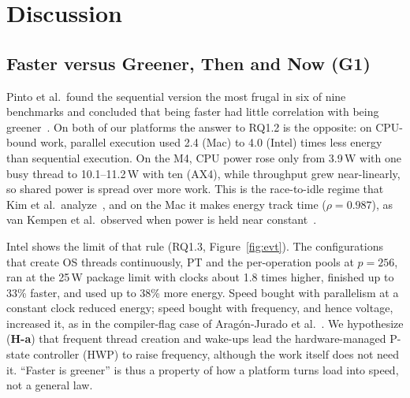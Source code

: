 \section{Discussion}\label{sec:discussion}

\subsection{Faster versus Greener, Then and Now (G1)}
Pinto et al.\ found the sequential version the most frugal in six of nine benchmarks and concluded that being faster had little correlation with being greener~\cite{pinto2014energy}. On both of our platforms the answer to RQ1.2 is the opposite: on CPU-bound work, parallel execution used 2.4 (Mac) to 4.0 (Intel) times less energy than sequential execution. On the M4, CPU power rose only from 3.9\,W with one busy thread to 10.1--11.2\,W with ten (AX4), while throughput grew near-linearly, so shared power is spread over more work. This is the race-to-idle regime that Kim et al.\ analyze~\cite{kim2015racing}, and on the Mac it makes energy track time ($\rho = 0.987$), as van Kempen et al.\ observed when power is held near constant~\cite{vankempen2025green}.

Intel shows the limit of that rule (RQ1.3, Figure~\ref{fig:evt}). The configurations that create OS threads continuously, PT and the per-operation pools at $p = 256$, ran at the 25\,W package limit with clocks about 1.8 times higher, finished up to 33\% faster, and used up to 38\% more energy. Speed bought with parallelism at a constant clock reduced energy; speed bought with frequency, and hence voltage, increased it, as in the compiler-flag case of Arag{\'o}n-Jurado et al.~\cite{aragonjurado2025faster}. We hypothesize (\textbf{H-a}) that frequent thread creation and wake-ups lead the hardware-managed P-state controller (HWP) to raise frequency, although the work itself does not need it. ``Faster is greener'' is thus a property of how a platform turns load into speed, not a general law.

